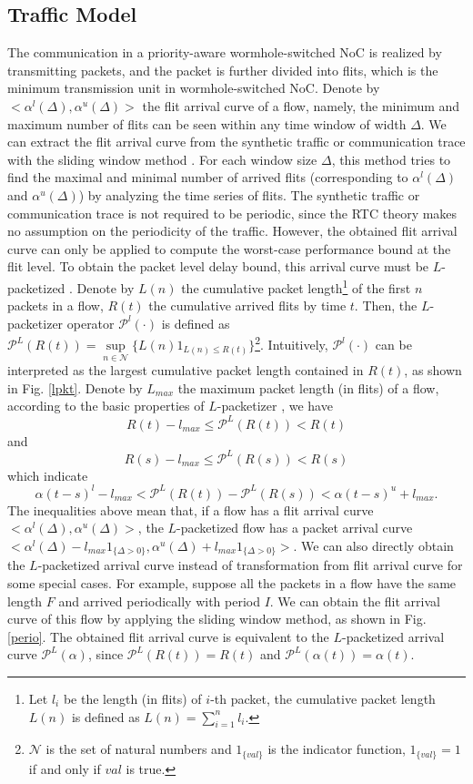 \documentclass[10pt,journal]{IEEEtran}
\begin{document}
\subsection{Traffic Model}\label{traffic}
The communication in a priority-aware wormhole-switched NoC is realized by transmitting packets, and the packet is further divided into flits, which is the minimum transmission unit in wormhole-switched NoC. Denote by $<\alpha^l(\Delta),\alpha^u(\Delta)>$ the flit arrival curve of a flow, namely, the minimum and maximum number of flits can be seen within any time window of width $\Delta$. We can extract the flit arrival curve from the synthetic traffic or communication trace with the sliding window method \cite{1253607}. For each window size $\Delta$, this method tries to find the maximal and minimal number of arrived flits (corresponding to $\alpha^l(\Delta)$ and $\alpha^u(\Delta)$) by analyzing the time series of flits. The synthetic traffic or communication trace is not required to be periodic, since the RTC theory makes no assumption on the periodicity of the traffic. However, the obtained flit arrival curve can only be applied to compute the worst-case performance bound at the flit level. To obtain the packet level delay bound, this arrival curve must be $L$-packetized \cite{Boudec2001Network}. Denote by $L(n)$ the cumulative packet length\footnote{Let $l_i$ be the length (in flits) of $i$-th packet, the cumulative packet length $L(n)$ is defined as $L(n)=\sum_{i=1}^n l_i$.} of the first $n$ packets in a flow, $R(t)$ the cumulative arrived flits by time $t$. Then, the $L$-packetizer operator $\mathcal{P}^l(\cdot)$ is defined as $\mathcal{P}^L(R(t))=\underset{n\in\mathcal{N}}{\sup}\{L(n)1_{L(n)\leq R(t)}\}$\footnote{$\mathcal{N}$ is the set of natural numbers and $1_{\{val\}}$ is the indicator function, $1_{\{val\}}=1$ if and only if $val$ is true.}. Intuitively, $\mathcal{P}^l(\cdot)$ can be interpreted as the largest cumulative packet length contained in $R(t)$, as shown in Fig. \ref{lpkt}. Denote by $L_{max}$ the maximum packet length (in flits) of a flow, according to the basic properties of $L$-packetizer \cite{Boudec2001Network}, we have
$$R(t)-l_{max}\leq \mathcal{P}^L(R(t))<R(t)$$
and
$$R(s)-l_{max}\leq \mathcal{P}^L(R(s))<R(s)$$
which indicate
$$\alpha(t-s)^l-l_{max}<\mathcal{P}^L(R(t))-\mathcal{P}^L(R(s))<\alpha(t-s)^u+l_{max}.$$
The inequalities above mean that, if a flow has a flit arrival curve $<\alpha^l(\Delta),\alpha^u(\Delta)>$, the $L$-packetized flow has a packet arrival curve $<\alpha^l(\Delta)-l_{max}1_{\{\Delta>0\}},\alpha^u(\Delta)+l_{max}1_{\{\Delta>0\}}>$. We can also directly obtain the $L$-packetized arrival curve instead of transformation from flit arrival curve for some special cases. For example, suppose all the packets in a flow have the same length $F$ and arrived periodically with period $I$. We can obtain the flit arrival curve of this flow by applying the sliding window method, as shown in Fig. \ref{perio}. The obtained flit arrival curve is equivalent to the $L$-packetized arrival curve $\mathcal{P}^L(\alpha)$, since $\mathcal{P}^L(R(t))=R(t)$ and $\mathcal{P}^L(\alpha(t))=\alpha(t)$.
\end{document}
